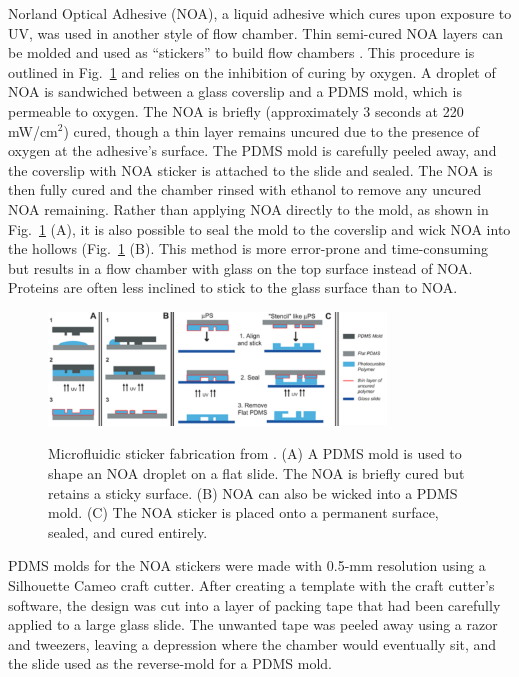 Norland Optical Adhesive (NOA), a liquid adhesive which cures upon exposure to UV, was used in another style of flow chamber.  Thin semi-cured NOA layers can be molded and used as ``stickers'' to build flow chambers \cite{bartolo08, paustian13}.  This procedure is outlined in Fig.~\ref{fig:stickers} and relies on the inhibition of curing by oxygen.  A droplet of NOA is sandwiched between a glass coverslip and a PDMS mold, which is permeable to oxygen. The NOA is briefly (approximately 3 seconds at 220 mW/cm$^2$) cured, though a thin layer remains uncured due to the presence of oxygen at the adhesive's surface. The PDMS mold is carefully peeled away, and the coverslip with NOA sticker is attached to the slide and sealed.  The NOA is then fully cured and the chamber rinsed with ethanol to remove any uncured NOA remaining. Rather than applying NOA directly to the mold, as shown in Fig.~\ref{fig:stickers} (A), it is also possible to seal the mold to the coverslip and wick NOA into the hollows (Fig.~\ref{fig:stickers} (B).  This method is more error-prone and time-consuming but results in a flow chamber with glass on the top surface instead of NOA.  Proteins are often less inclined to stick to the glass surface than to NOA.

\begin{figure}
\caption{Microfluidic sticker fabrication from \cite{bartolo08}. (A) A PDMS mold is used to shape an NOA droplet on a flat slide.  The NOA is briefly cured but retains a sticky surface.  (B) NOA can also be wicked into a PDMS mold. (C) The NOA sticker is placed onto a permanent surface, sealed, and cured entirely.}
\centering
\includegraphics[width=0.8\textwidth]{figs/ch03/sticker-bartolo.pdf}
\label{fig:stickers}
\end{figure}

PDMS molds for the NOA stickers were made with 0.5-mm resolution using a Silhouette Cameo craft cutter.  After creating a template with the craft cutter's software, the design was cut into a layer of packing tape that had been carefully applied to a large glass slide. The unwanted tape was peeled away using a razor and tweezers, leaving a depression where the chamber would eventually sit, and the slide used as the reverse-mold for a PDMS mold.

